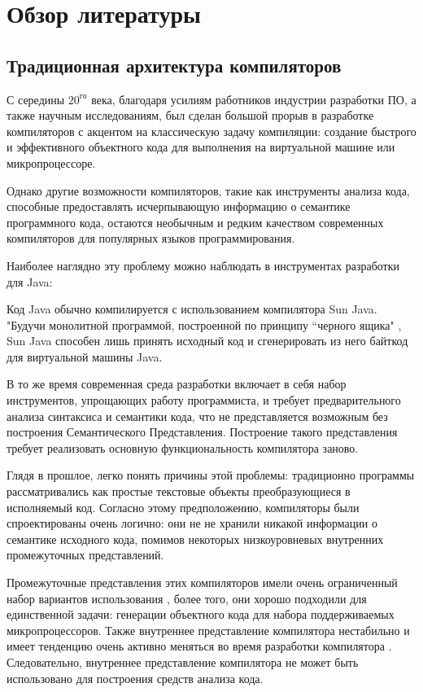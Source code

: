 \chapter{Обзор литературы}
\label{chap:lr}

\section{Традиционная архитектура компиляторов}
\label{sec:review_1}

С середины $20^{го}$ века, благодаря усилиям работников индустрии разработки ПО, а также научным исследованиям, был сделан большой прорыв в разработке компиляторов с акцентом на классическую задачу компиляции: 
создание быстрого и эффективного объектного кода для выполнения на виртуальной
машине или микропроцессоре.


Однако другие возможности компиляторов, такие как инструменты анализа кода, 
способные предоставлять исчерпывающую информацию о семантике программного кода,
остаются необычным и редким качеством современных компиляторов для популярных языков программирования.

Наиболее наглядно эту проблему можно наблюдать в инструментах разработки для Java:

Код Java обычно компилируется с использованием компилятора Sun Java. "Будучи
монолитной программой, построенной по принципу ``черного ящика" \cite{Zouev2005}, 
Sun Java способен лишь принять исходный код и сгенерировать из него байткод для виртуальной машины Java.


В то же время современная среда разработки включает в себя набор инструментов,
упрощающих работу программиста, и требует предварительного анализа синтаксиса и семантики кода, 
что не представляется возможным без построения Семантического Представления\cite{Zouev2005}. 
Построение такого представления требует реализовать основную функциональность компилятора заново.


Глядя в прошлое, легко понять причины этой проблемы: 
традиционно программы рассматривались как простые текстовые объекты
преобразующиеся в исполняемый код. Согласно этому предположению, компиляторы
были спроектированы очень логично: они не не хранили никакой информации о семантике исходного кода, 
помимов некоторых низкоуровневых внутренних промежуточных представлений.


Промежуточные представления этих компиляторов имели очень ограниченный набор вариантов использования \cite{Zouev2005, Zouev2010}, более того, они
хорошо подходили для единственной задачи: генерации объектного кода для набора поддерживаемых микропроцессоров. 
Также внутреннее представление компилятора нестабильно и имеет тенденцию очень активно меняться
во время разработки компилятора \cite{FreeSoftwareFoundation2016}. Следовательно, внутреннее представление компилятора не может 
быть использовано для построения средств анализа кода.

